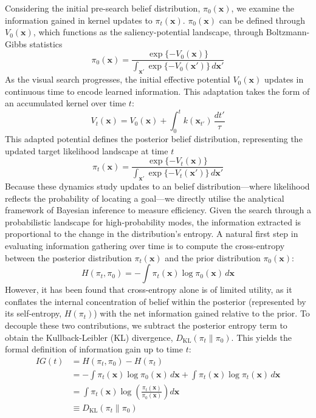 Considering the initial pre-search belief distribution, $\pi_0(\textbf{x})$, we examine the information gained in kernel updates to $\pi_t(\textbf{x})$. $\pi_0(\textbf{x})$ can be defined through $V_0(\textbf{x})$, which functions as the saliency-potential landscape, through Boltzmann-Gibbs statistics
\begin{equation}
    \pi_0(\textbf{x}) = \frac{\exp\{-V_0(\textbf{x})\}}{\int_{\textbf{x}'} \exp\{-V_0(\textbf{x}')\} \, d\textbf{x}'}
\end{equation}
As the visual search progresses, the initial effective potential $V_0(\textbf{x})$ updates in continuous time to encode learned information. This adaptation takes the form of an accumulated kernel over time $t$:
\begin{equation}
    V_t(\textbf{x}) = V_0(\textbf{x}) + \int_0^t k(\textbf{x}_{t'}) \, \frac{dt'}{\tau}
\end{equation}
This adapted potential defines the posterior belief distribution, representing the updated target likelihood landscape at time $t$
\begin{equation}
    \pi_t(\textbf{x}) = \frac{\exp\{-V_t(\textbf{x})\}}{\int_{\textbf{x}'} \exp\{-V_t(\textbf{x}')\} \, d\textbf{x}'}
\end{equation}
Because these dynamics study updates to an belief distribution—where likelihood reflects the probability of locating a goal—we directly utilise the analytical framework of Bayesian inference to measure efficiency. Given the search through a probabilistic landscape for high-probability modes, the information extracted is proportional to the change in the distribution's entropy. A natural first step in evaluating information gathering over time is to compute the cross-entropy between the posterior distribution $\pi_t(\textbf{x})$ and the prior distribution $\pi_0(\textbf{x})$:
\begin{equation}
    H(\pi_t, \pi_0) = -\int \pi_t(\textbf{x}) \log \pi_0(\textbf{x}) \, d\textbf{x}
\end{equation}
However, it has been found that cross-entropy alone is of limited utility, as it conflates the internal concentration of belief within the posterior (represented by its self-entropy, $H(\pi_t)$) with the net information gained relative to the prior. To decouple these two contributions, we subtract the posterior entropy term to obtain the Kullback-Leibler (KL) divergence, $D_{\text{KL}}(\pi_t \parallel \pi_0)$. This yields the formal definition of information gain up to time $t$:
\begin{align}
    IG(t) &= H(\pi_t, \pi_0) - H(\pi_t) \nonumber \\
          &= -\int \pi_t(\textbf{x}) \log \pi_0(\textbf{x}) \, d\textbf{x} + \int \pi_t(\textbf{x}) \log \pi_t(\textbf{x}) \, d\textbf{x} \nonumber \\
          &= \int \pi_t(\textbf{x}) \log \left( \frac{\pi_t(\textbf{x})}{\pi_0(\textbf{x})} \right) d\textbf{x} \nonumber \\
          &\equiv D_{\text{KL}}(\pi_t \parallel \pi_0) \label{eq:information_gain}
\end{align}
